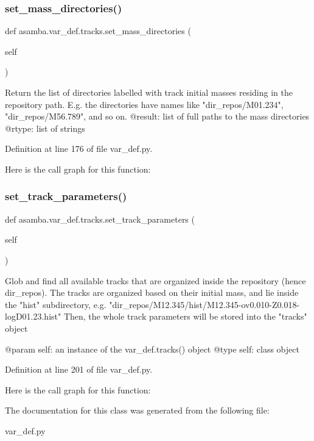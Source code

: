 \subsubsection{\texorpdfstring{set\+\_\+mass\+\_\+directories()}{set\_mass\_directories()}}
{\footnotesize\ttfamily def asamba.\+var\+\_\+def.\+tracks.\+set\+\_\+mass\+\_\+directories (\begin{DoxyParamCaption}\item[{}]{self }\end{DoxyParamCaption})}

\begin{DoxyVerb}Return the list of directories labelled with track initial masses residing in the repository path.
E.g. the directories have names like "dir_repos/M01.234", "dir_repos/M56.789", and so on.
@result: list of full paths to the mass directories
@rtype: list of strings
\end{DoxyVerb}
 

Definition at line 176 of file var\+\_\+def.\+py.

Here is the call graph for this function\+:
\mbox{\label{classasamba_1_1var__def_1_1tracks_a743c0e7e4af42a5c67f8a4be54a7d3c6}} 
\subsubsection{\texorpdfstring{set\+\_\+track\+\_\+parameters()}{set\_track\_parameters()}}
{\footnotesize\ttfamily def asamba.\+var\+\_\+def.\+tracks.\+set\+\_\+track\+\_\+parameters (\begin{DoxyParamCaption}\item[{}]{self }\end{DoxyParamCaption})}

\begin{DoxyVerb}Glob and find all available tracks that are organized inside the repository (hence dir_repos).
The tracks are organized based on their initial mass, and lie inside the "hist" subdirectory, e.g.
"dir_repos/M12.345/hist/M12.345-ov0.010-Z0.018-logD01.23.hist"
Then, the whole track parameters will be stored into the "tracks" object

@param self: an instance of the var_def.tracks() object
@type self: class object
\end{DoxyVerb}
 

Definition at line 201 of file var\+\_\+def.\+py.

Here is the call graph for this function\+:


The documentation for this class was generated from the following file\+:\begin{DoxyCompactItemize}
\item 
var\+\_\+def.\+py\end{DoxyCompactItemize}
